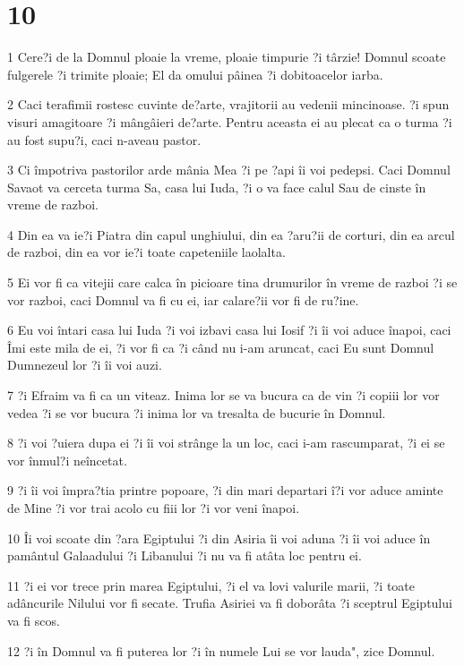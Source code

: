 \chapter{10}

\par 1 Cere?i de la Domnul ploaie la vreme, ploaie timpurie ?i târzie! Domnul scoate fulgerele ?i trimite ploaie; El da omului pâinea ?i dobitoacelor iarba.
\par 2 Caci terafimii rostesc cuvinte de?arte, vrajitorii au vedenii mincinoase. ?i spun visuri amagitoare ?i mângâieri de?arte. Pentru aceasta ei au plecat ca o turma ?i au fost supu?i, caci n-aveau pastor.
\par 3 Ci împotriva pastorilor arde mânia Mea ?i pe ?api îi voi pedepsi. Caci Domnul Savaot va cerceta turma Sa, casa lui Iuda, ?i o va face calul Sau de cinste în vreme de razboi.
\par 4 Din ea va ie?i Piatra din capul unghiului, din ea ?aru?ii de corturi, din ea arcul de razboi, din ea vor ie?i toate capeteniile laolalta.
\par 5 Ei vor fi ca vitejii care calca în picioare tina drumurilor în vreme de razboi ?i se vor razboi, caci Domnul va fi cu ei, iar calare?ii vor fi de ru?ine.
\par 6 Eu voi întari casa lui Iuda ?i voi izbavi casa lui Iosif ?i îi voi aduce înapoi, caci Îmi este mila de ei, ?i vor fi ca ?i când nu i-am aruncat, caci Eu sunt Domnul Dumnezeul lor ?i îi voi auzi.
\par 7 ?i Efraim va fi ca un viteaz. Inima lor se va bucura ca de vin ?i copiii lor vor vedea ?i se vor bucura ?i inima lor va tresalta de bucurie în Domnul.
\par 8 ?i voi ?uiera dupa ei ?i îi voi strânge la un loc, caci i-am rascumparat, ?i ei se vor înmul?i neîncetat.
\par 9 ?i îi voi împra?tia printre popoare, ?i din mari departari î?i vor aduce aminte de Mine ?i vor trai acolo cu fiii lor ?i vor veni înapoi.
\par 10 Îi voi scoate din ?ara Egiptului ?i din Asiria îi voi aduna ?i îi voi aduce în pamântul Galaadului ?i Libanului ?i nu va fi atâta loc pentru ei.
\par 11 ?i ei vor trece prin marea Egiptului, ?i el va lovi valurile marii, ?i toate adâncurile Nilului vor fi secate. Trufia Asiriei va fi doborâta ?i sceptrul Egiptului va fi scos.
\par 12 ?i în Domnul va fi puterea lor ?i în numele Lui se vor lauda", zice Domnul.

